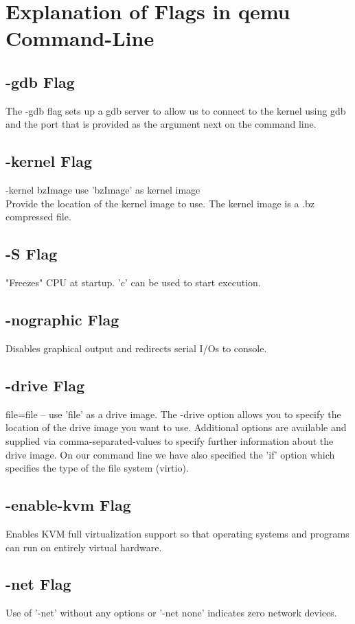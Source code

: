 \documentclass[10pt,a4paper,english]{article}
\begin{document}
\section{Explanation of Flags in qemu Command-Line}
\label{sec:flags}

\subsection{-gdb Flag}
The -gdb flag sets up a gdb server to allow us to connect to the kernel using gdb and the port that is provided as the argument next on the command line.

\subsection{-kernel Flag}
-kernel bzImage use 'bzImage' as kernel image\\
Provide the location of the kernel image to use. The kernel image is a .bz compressed file.

\subsection{-S Flag}
"Freezes" CPU at startup. 'c' can be used to start execution.

\subsection{-nographic Flag}
Disables graphical output and redirects serial I/Os to console.  

\subsection{-drive Flag}
file=file -- use 'file' as a drive image.
The -drive option allows you to specify the location of the drive image you want to use. Additional options are available and supplied via comma-separated-values to specify further information about the drive image. On our command line we have also specified the 'if' option which specifies the type of the file system (virtio).

\subsection{-enable-kvm Flag}
Enables KVM full virtualization support so that operating systems and programs can run on entirely virtual hardware.

\subsection{-net Flag}
Use of '-net' without any options or '-net none' indicates zero network devices.
\end{document}

